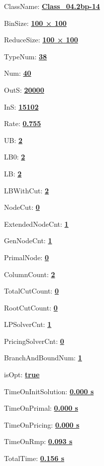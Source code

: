 \documentclass[11pt]{article}
\begin{document}
\pagestyle{empty}


ClassName: \underline{\textbf{Class_04.2bp-14}}
\par
BinSize: \underline{\textbf{100 × 100}}
\par
ReduceSize: \underline{\textbf{100 × 100}}
\par
TypeNum: \underline{\textbf{38}}
\par
Num: \underline{\textbf{40}}
\par
OutS: \underline{\textbf{20000}}
\par
InS: \underline{\textbf{15102}}
\par
Rate: \underline{\textbf{0.755}}
\par
UB: \underline{\textbf{2}}
\par
LB0: \underline{\textbf{2}}
\par
LB: \underline{\textbf{2}}
\par
LBWithCut: \underline{\textbf{2}}
\par
NodeCut: \underline{\textbf{0}}
\par
ExtendedNodeCnt: \underline{\textbf{1}}
\par
GenNodeCnt: \underline{\textbf{1}}
\par
PrimalNode: \underline{\textbf{0}}
\par
ColumnCount: \underline{\textbf{2}}
\par
TotalCutCount: \underline{\textbf{0}}
\par
RootCutCount: \underline{\textbf{0}}
\par
LPSolverCnt: \underline{\textbf{1}}
\par
PricingSolverCnt: \underline{\textbf{0}}
\par
BranchAndBoundNum: \underline{\textbf{1}}
\par
isOpt: \underline{\textbf{true}}
\par
TimeOnInitSolution: \underline{\textbf{0.000 s}}
\par
TimeOnPrimal: \underline{\textbf{0.000 s}}
\par
TimeOnPricing: \underline{\textbf{0.000 s}}
\par
TimeOnRmp: \underline{\textbf{0.093 s}}
\par
TotalTime: \underline{\textbf{0.156 s}}
\par
\newpage
\end{document}
